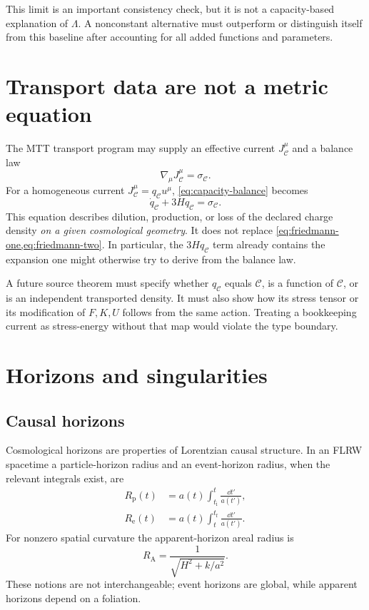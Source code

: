 \documentclass[11pt]{article}
\newcommand{\CC}{\mathcal C}
\begin{document}
This limit is an important consistency check, but it is not a
capacity-based explanation of $\Lambda$.  A nonconstant alternative
must outperform or distinguish itself from this baseline after accounting
for all added functions and parameters.

\section{Transport data are not a metric equation}

The MTT transport program may supply an effective current
$J^\mu_{\CC}$ and a balance law
\begin{equation}
 \nabla_\mu J^\mu_{\CC}=\sigma_{\CC}.
 \label{eq:capacity-balance}
\end{equation}
For a homogeneous current $J^\mu_{\CC}=q_{\CC}u^\mu$,
\cref{eq:capacity-balance} becomes
\[
 \dot q_{\CC}+3Hq_{\CC}=\sigma_{\CC}.
\]
This equation describes dilution, production, or loss of the declared
charge density \emph{on a given cosmological geometry}.  It does not
replace \cref{eq:friedmann-one,eq:friedmann-two}.  In particular, the
$3Hq_{\CC}$ term already contains the expansion one might otherwise try
to derive from the balance law.

A future source theorem must specify whether $q_{\CC}$ equals $\CC$, is a
function of $\CC$, or is an independent transported density.  It must
also show how its stress tensor or its modification of $F,K,U$ follows
from the same action.  Treating a bookkeeping current as stress-energy
without that map would violate the type boundary.

\section{Horizons and singularities}

\subsection{Causal horizons}

Cosmological horizons are properties of Lorentzian causal structure.  In
an FLRW spacetime a particle-horizon radius and an event-horizon radius,
when the relevant integrals exist, are
\begin{align}
 R_{\mathrm p}(t)
 &=a(t)\int_{t_{\mathrm i}}^t\frac{\dd t'}{a(t')},\\
 R_{\mathrm e}(t)
 &=a(t)\int_t^{t_{\mathrm f}}\frac{\dd t'}{a(t')}.
\end{align}
For nonzero spatial curvature the apparent-horizon areal radius is
\[
 R_{\mathrm A}=\frac{1}{\sqrt{H^2+k/a^2}}.
\]
These notions are not interchangeable; event horizons are global, while
apparent horizons depend on a foliation.
\end{document}
